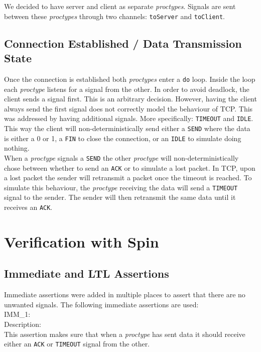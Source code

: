 \documentclass{WigReport}
\begin{document}
We decided to have server and client as separate \textit{proctypes}. Signals
are sent between these \textit{proctypes} through two channels:
\verb|toServer| and \verb|toClient|.

\subsection{Connection Established / Data Transmission State}

Once the connection is established both \textit{proctypes} enter a \verb|do|
loop. Inside the loop each \textit{proctype} listens for a signal from the
other. In order to avoid deadlock, the client sends a signal first. This is an
arbitrary decision. However, having the client always send the first signal
does not correctly model the behaviour of TCP. This was addressed by having
additional signals. More specifically: \verb|TIMEOUT| and \verb|IDLE|. This
way the client will non-deterministically send either a \verb|SEND| where the
data is either a 0 or 1, a \verb|FIN| to close the connection, or an
\verb|IDLE| to simulate doing nothing. \\

When a \textit{proctype} signals a \verb|SEND| the other \textit{proctype}
will non-deterministically chose between whether to send an \verb|ACK| or to
simulate a lost packet. In TCP, upon a lost packet the sender will retransmit
a packet once the timeout is reached. To simulate this behaviour, the
\textit{proctype} receiving the data will send a \verb|TIMEOUT| signal to
the sender. The sender will then retransmit the same data until it receives
an \verb|ACK|.

\section{Verification with Spin}

\subsection{Immediate and LTL Assertions}

Immediate assertions were added in multiple places to assert that there are no unwanted signals. The following immediate assertions are used:
\\

IMM\_1:\\
Description:\\
This assertion makes sure that when a \textit{proctype} has sent data it should receive either an \verb|ACK| or \verb|TIMEOUT| signal from the other.
\\
\end{document}
